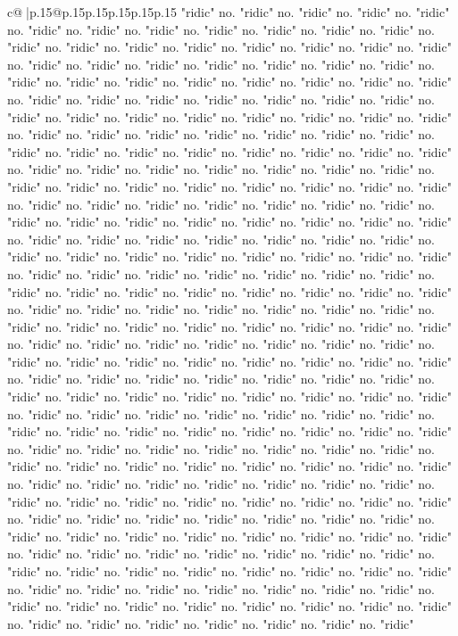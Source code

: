 \documentclass{article}
\begin{document}
{\begin{supertabular}{c@{$\;$}|p{.15\linewidth}@{}p{.15\linewidth}p{.15\linewidth}p{.15\linewidth}p{.15\linewidth}p{.15\linewidth}}
{{{"ridic" no. "ridic" no. "ridic" no. "ridic" no. "ridic" no. "ridic" no. "ridic" no. "ridic" no. "ridic" no. "ridic" no. "ridic" no. "ridic" no. "ridic" no. "ridic" no. "ridic" no. "ridic" no. "ridic" no. "ridic" no. "ridic" no. "ridic" no. "ridic" no. "ridic" no. "ridic" no. "ridic" no. "ridic" no. "ridic" no. "ridic" no. "ridic" no. "ridic" no. "ridic" no. "ridic" no. "ridic" no. "ridic" no. "ridic" no. "ridic" no. "ridic" no. "ridic" no. "ridic" no. "ridic" no. "ridic" no. "ridic" no. "ridic" no. "ridic" no. "ridic" no. "ridic" no. "ridic" no. "ridic" no. "ridic" no. "ridic" no. "ridic" no. "ridic" no. "ridic" no. "ridic" no. "ridic" no. "ridic" no. "ridic" no. "ridic" no. "ridic" no. "ridic" no. "ridic" no. "ridic" no. "ridic" no. "ridic" no. "ridic" no. "ridic" no. "ridic" no. "ridic" no. "ridic" no. "ridic" no. "ridic" no. "ridic" no. "ridic" no. "ridic" no. "ridic" no. "ridic" no. "ridic" no. "ridic" no. "ridic" no. "ridic" no. "ridic" no. "ridic" no. "ridic" no. "ridic" no. "ridic" no. "ridic" no. "ridic" no. "ridic" no. "ridic" no. "ridic" no. "ridic" no. "ridic" no. "ridic" no. "ridic" no. "ridic" no. "ridic" no. "ridic" no. "ridic" no. "ridic" no. "ridic" no. "ridic" no. "ridic" no. "ridic" no. "ridic" no. "ridic" no. "ridic" no. "ridic" no. "ridic" no. "ridic" no. "ridic" no. "ridic" no. "ridic" no. "ridic" no. "ridic" no. "ridic" no. "ridic" no. "ridic" no. "ridic" no. "ridic" no. "ridic" no. "ridic" no. "ridic" no. "ridic" no. "ridic" no. "ridic" no. "ridic" no. "ridic" no. "ridic" no. "ridic" no. "ridic" no. "ridic" no. "ridic" no. "ridic" no. "ridic" no. "ridic" no. "ridic" no. "ridic" no. "ridic" no. "ridic" no. "ridic" no. "ridic" no. "ridic" no. "ridic" no. "ridic" no. "ridic" no. "ridic" no. "ridic" no. "ridic" no. "ridic" no. "ridic" no. "ridic" no. "ridic" no. "ridic" no. "ridic" no. "ridic" no. "ridic" no. "ridic" no. "ridic" no. "ridic" no. "ridic" no. "ridic" no. "ridic" no. "ridic" no. "ridic" no. "ridic" no. "ridic" no. "ridic" no. "ridic" no. "ridic" no. "ridic" no. "ridic" no. "ridic" no. "ridic" no. "ridic" no. "ridic" no. "ridic" no. "ridic" no. "ridic" no. "ridic" no. "ridic" no. "ridic" no. "ridic" no. "ridic" no. "ridic" no. "ridic" no. "ridic" no. "ridic" no. "ridic" no. "ridic" no. "ridic" no. "ridic" no. "ridic" no. "ridic" no. "ridic" no. "ridic" no. "ridic" no. "ridic" no. "ridic" no. "ridic" no. "ridic" no. "ridic" no. "ridic" no. "ridic" no. "ridic" no. "ridic" no. "ridic" no. "ridic" no. "ridic" no. "ridic" no. "ridic" no. "ridic" no. "ridic" no. "ridic" no. "ridic" no. "ridic" no. "ridic" no. "ridic" no. "ridic" no. "ridic" no. "ridic" no. "ridic" no. "ridic" no. "ridic" no. "ridic" no. "ridic" no. "ridic" no. "ridic" no. "ridic" no. "ridic" no. "ridic" no. "ridic" no. "ridic" no. "ridic" no. "ridic" no. "ridic" no. "ridic" no. "ridic" no. "ridic" no. "ridic" no. "ridic" no. "ridic" no. "ridic" no. "ridic" no. "ridic" no. "ridic" no. "ridic" no. "ridic" no. "ridic" no. "ridic" no. "ridic" no. "ridic" no. "ridic" no. "ridic" no. "ridic" no. "ridic" no. "ridic" no. "ridic" no. "ridic" no. "ridic" no. "ridic" no. "ridic" no. "ridic" no. "ridic" no. "ridic" no. "ridic" no. "ridic" no. "ridic" no. "ridic" }}}
\end{supertabular}}
\end{document}
